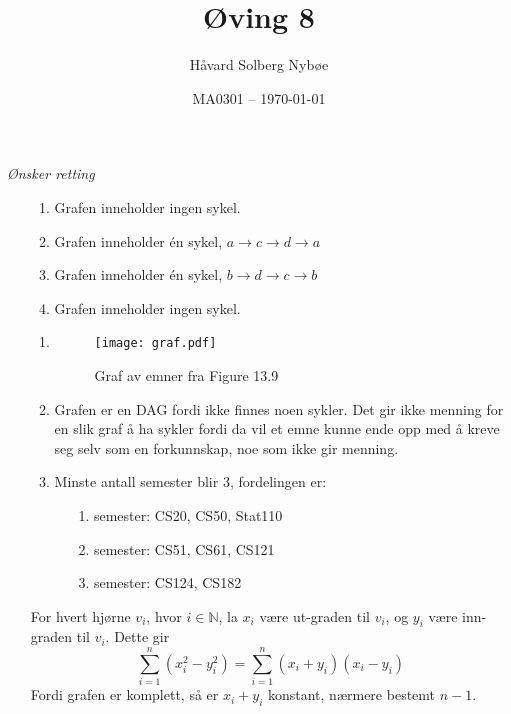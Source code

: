 \documentclass[a4paper, 12pt]{article}  %
\title{Øving 8}                         %
\author{Håvard Solberg Nybøe}           %
\date{MA0301 -- \today}                 %
\begin{document}
\maketitle

\emph{Ønsker retting}

\begin{enumerate}
    \item [\boxed{1}]
          \begin{enumerate}
              \item Grafen inneholder ingen sykel.
              \item Grafen inneholder én sykel, \(a \rightarrow c \rightarrow d \rightarrow a\)
              \item Grafen inneholder én sykel, \(b \rightarrow d \rightarrow c \rightarrow b\)
              \item Grafen inneholder ingen sykel.
          \end{enumerate}
    \item [\boxed{2}] \begin{enumerate}
        \item \textit{ }
        \begin{figure*}[h!]
            \centering
            \texttt{[image: graf.pdf]}
            \caption{Graf av emner fra Figure 13.9}
        \end{figure*}
        \item Grafen er en DAG fordi ikke finnes noen sykler. Det gir ikke menning for en slik graf å ha sykler fordi da vil et emne kunne ende opp med å kreve seg selv som en forkunnskap, noe som ikke gir menning.
        \item Minste antall semester blir 3, fordelingen er:
        \begin{enumerate}
            \item [1.]semester: CS20, CS50, Stat110
            \item [2.]semester: CS51, CS61, CS121
            \item [3.]semester: CS124, CS182
        \end{enumerate}
    \end{enumerate}\newpage
    \item [\boxed{3}] For hvert hjørne \(v_i\), hvor \(i \in \mathbb{N}\), la \(x_i\) være ut-graden til \(v_i\), og \(y_i\) være inn-graden til \(v_i\).
    Dette gir 
    \[\sum^n_{i=1}(x^2_i - y^2_i) = \sum^n_{i=1}(x_i + y_i)(x_i - y_i)\]
    Fordi grafen er komplett, så er \(x_i + y_i\) konstant, nærmere bestemt \(n - 1\).

\end{enumerate}
\end{document}
